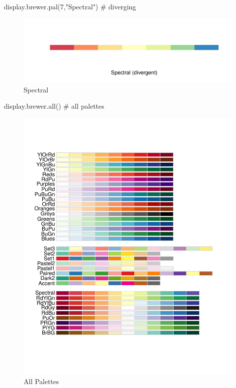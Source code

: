 \documentclass[
]{article}
\newenvironment{Shaded}{}{}
\newcommand{\CommentTok}[1]{\textcolor[rgb]{0.00,0.50,0.00}{#1}}
\newcommand{\DecValTok}[1]{#1}
\newcommand{\KeywordTok}[1]{\textcolor[rgb]{0.00,0.00,1.00}{#1}}
\newcommand{\NormalTok}[1]{#1}
\newcommand{\StringTok}[1]{\textcolor[rgb]{0.00,0.50,0.50}{#1}}
\begin{document}
\begin{Shaded}
\begin{Highlighting}[]
\KeywordTok{display.brewer.pal}\NormalTok{(}\DecValTok{7}\NormalTok{,}\StringTok{"Spectral"}\NormalTok{) }\CommentTok{# diverging}
\end{Highlighting}
\end{Shaded}

\begin{figure}
\centering
\includegraphics{design_files/figure-latex/unnamed-chunk-6-1.pdf}
\caption{Spectral}
\end{figure}

\begin{Shaded}
\begin{Highlighting}[]
\KeywordTok{display.brewer.all}\NormalTok{() }\CommentTok{# all palettes}
\end{Highlighting}
\end{Shaded}

\begin{figure}
\centering
\includegraphics{design_files/figure-latex/unnamed-chunk-7-1.pdf}
\caption{All Palettes}
\end{figure}
\end{document}
